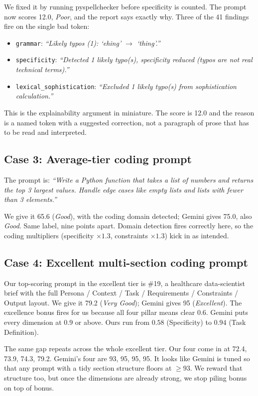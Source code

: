 \documentclass[conference]{IEEEtran}
\begin{document}
We fixed it by running pyspellchecker before specificity is counted. The prompt now scores 12.0, \emph{Poor}, and the report says exactly why. Three of the 41 findings fire on the single bad token:

\begin{itemize}
\item \texttt{grammar}: \emph{``Likely typos (1): `ehing' $\to$ `thing'.''}
\item \texttt{specificity}: \emph{``Detected 1 likely typo(s), specificity reduced (typos are not real technical terms).''}
\item \texttt{lexical\_sophistication}: \emph{``Excluded 1 likely typo(s) from sophistication calculation.''}
\end{itemize}

This is the explainability argument in miniature. The score is 12.0 and the reason is a named token with a suggested correction, not a paragraph of prose that has to be read and interpreted.

\subsection{Case 3: Average-tier coding prompt}
The prompt is: \emph{``Write a Python function that takes a list of numbers and returns the top 3 largest values. Handle edge cases like empty lists and lists with fewer than 3 elements.''}

We give it 65.6 (\emph{Good}), with the coding domain detected; Gemini gives 75.0, also \emph{Good}. Same label, nine points apart. Domain detection fires correctly here, so the coding multipliers (specificity $\times 1.3$, constraints $\times 1.3$) kick in as intended.

\subsection{Case 4: Excellent multi-section coding prompt}
Our top-scoring prompt in the excellent tier is \#19, a healthcare data-scientist brief with the full Persona / Context / Task / Requirements / Constraints / Output layout. We give it 79.2 (\emph{Very Good}); Gemini gives 95 (\emph{Excellent}). The excellence bonus fires for us because all four pillar means clear $0.6$. Gemini puts every dimension at $0.9$ or above. Ours run from $0.58$ (Specificity) to $0.94$ (Task Definition).

The same gap repeats across the whole excellent tier. Our four come in at 72.4, 73.9, 74.3, 79.2. Gemini's four are 93, 95, 95, 95. It looks like Gemini is tuned so that any prompt with a tidy section structure floors at $\geq 93$. We reward that structure too, but once the dimensions are already strong, we stop piling bonus on top of bonus.
\end{document}

